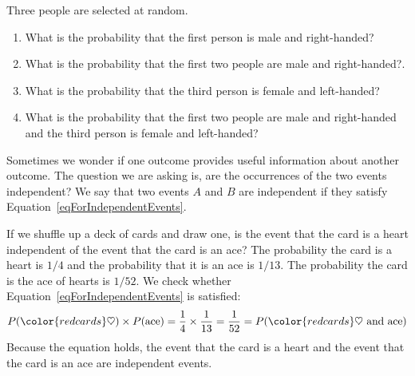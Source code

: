 \begin{exercisewrap}
\begin{nexercise}
Three people are selected at random.\footnotemark \vspace{-1.5mm}
\begin{enumerate}
\setlength{\itemsep}{0mm}
\item[(a)] What is the probability that the first person is male and right-handed?
\item[(b)] What is the probability that the first two people are male and right-handed?.
\item[(c)] What is the probability that the third person is female and left-handed?
\item[(d)] What is the probability that the first two people are male and right-handed and the third person is female and left-handed?
\end{enumerate}
\end{nexercise}
\end{exercisewrap}

Sometimes we wonder if one outcome provides useful information about another outcome. The question we are asking is, are the occurrences of the two events independent? We say that two events $A$ and $B$ are independent if they satisfy Equation~\eqref{eqForIndependentEvents}.

\begin{examplewrap}
\begin{nexample}{If we shuffle up a deck of cards and draw one, is the event that the card is a heart independent of the event that the card is an ace?}
The probability the card is a heart is $1/4$ and the probability that it is an ace is $1/13$. The probability the card is the ace of hearts is $1/52$. We check whether Equation~\ref{eqForIndependentEvents} is satisfied:
\begin{align*}
P({\color{redcards}\heartsuit})\times P(\text{ace}) = \frac{1}{4}\times \frac{1}{13} = \frac{1}{52} 
					= P({\color{redcards}\heartsuit}\text{ and ace})
\end{align*}
Because the equation holds, the event that the card is a heart and the event that the card is an ace are independent events.
\end{nexample}
\end{examplewrap}




